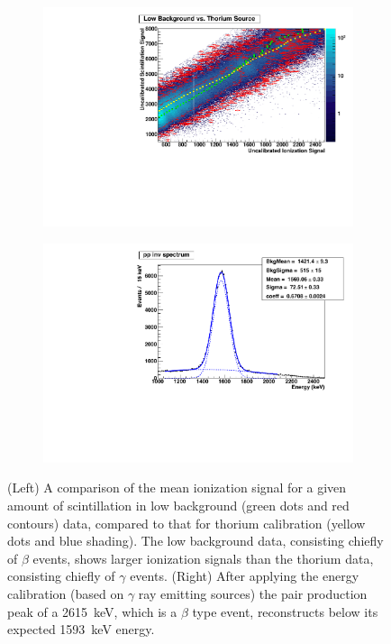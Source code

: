 \documentclass[herrin-thesis.tex]{subfiles}
\begin{document}
\begin{figure}[htp]
\centering
	\begin{subfigure}[c]{0.48\textwidth}
	\centering
	\includegraphics[width=\textwidth]{./plots/analysis_beta_gamma_comparison.pdf}
	\end{subfigure}\hfill%
	\begin{subfigure}[c]{0.48\textwidth}
	\centering
	\includegraphics[width=\textwidth]{./plots/analysis_calibrated_pp_peak.pdf}
	\end{subfigure}
	\caption[Evidence that \(\beta\) and \(\gamma\) events might have different energy scales]{(Left) A comparison of the mean ionization signal for a given amount of scintillation in low background (green dots and red contours) data, compared to that for thorium calibration (yellow dots and blue shading). The low background data, consisting chiefly of \(\beta\) events, shows larger ionization signals than the thorium data, consisting chiefly of \(\gamma\) events. (Right) After applying the energy calibration (based on \(\gamma\) ray emitting sources) the pair production peak of a \SI{2615}{\keV}, which is a \(\beta\) type event, reconstructs below its expected \SI{1593}{\keV} energy.}
\label{fig:analysis_beta_scale}
\end{figure}
\end{document}
